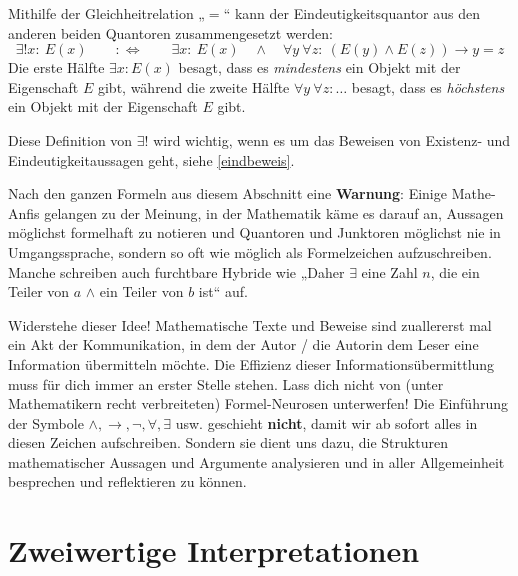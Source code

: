 \begin{bem} \label{eindquantzerlegung}
    Mithilfe der Gleichheitrelation „$=$“ kann der Eindeutigkeitsquantor aus den anderen beiden Quantoren zusammengesetzt werden:
        \[ \exists ! x:\ E(x)\qquad :\Leftrightarrow\qquad \exists x:\ E(x) \quad \land\quad \forall y\ \forall z:\ (E(y)\land E(z)) \to y=z \]
    Die erste Hälfte $\exists x: E(x)$ besagt, dass es \emph{mindestens} ein Objekt mit der Eigenschaft $E$ gibt, während die zweite Hälfte $\forall y\ \forall z:\dots$ besagt, dass es \emph{höchstens} ein Objekt mit der Eigenschaft $E$ gibt.
    
    Diese Definition von $\exists!$ wird wichtig, wenn es um das Beweisen von Existenz- und Eindeutigkeitaussagen geht, siehe \cref{eindbeweis}. 
\end{bem}


\begin{bem}
    Nach den ganzen Formeln aus diesem Abschnitt eine \textbf{Warnung}: Einige Mathe-Anfis gelangen zu der Meinung, in der Mathematik käme es darauf an, Aussagen möglichst formelhaft zu notieren und Quantoren und Junktoren möglichst nie in Umgangssprache, sondern so oft wie möglich als Formelzeichen aufzuschreiben. Manche schreiben auch furchtbare Hybride wie „Daher $\exists$ eine Zahl $n$, die ein Teiler von $a$ $\land$ ein Teiler von $b$ ist“ auf.
    
    Widerstehe dieser Idee! Mathematische Texte und Beweise sind zuallererst mal ein Akt der Kommunikation, in dem der Autor / die Autorin dem Leser eine Information übermitteln möchte. Die Effizienz dieser Informationsübermittlung muss für dich immer an erster Stelle stehen. Lass dich nicht von (unter Mathematikern recht verbreiteten) Formel-Neurosen unterwerfen! Die Einführung der Symbole $\land,\to,\neg,\forall,\exists$ usw. geschieht \textbf{nicht}, damit wir ab sofort alles in diesen Zeichen aufschreiben. Sondern sie dient uns dazu, die Strukturen mathematischer Aussagen und Argumente analysieren und in aller Allgemeinheit besprechen und reflektieren zu können.
\end{bem}





\section{Zweiwertige Interpretationen}


